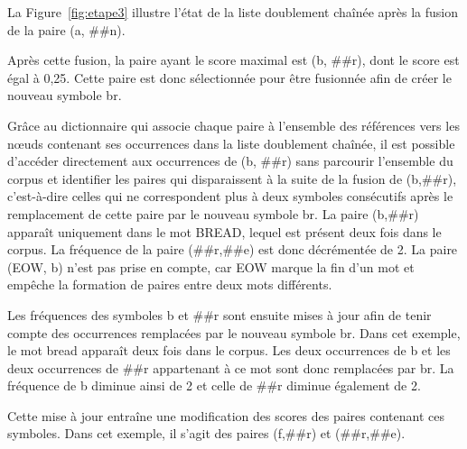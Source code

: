 \documentclass[12pt,a4paper]{report}
\begin{document}
	La Figure~\ref{fig:etape3} illustre l'état de la liste doublement chaînée après la fusion de la paire (a, \#\#n).
	
	Après cette fusion, la paire ayant le score maximal est (b, \#\#r), dont le score est égal à 0,25. Cette paire est donc sélectionnée pour être fusionnée afin de créer le nouveau symbole br.
	
	Grâce au dictionnaire qui associe chaque paire à l'ensemble des références vers les nœuds contenant ses occurrences dans la liste doublement chaînée, il est possible d'accéder directement aux occurrences de (b, \#\#r) sans parcourir l'ensemble du corpus et identifier les paires qui disparaissent à la suite de la fusion de (b,\#\#r), c'est-à-dire celles qui ne correspondent plus à deux symboles consécutifs après le remplacement de cette paire par le nouveau symbole br.
	La paire (b,\#\#r) apparaît uniquement dans le mot BREAD, lequel est présent deux fois dans le corpus. La fréquence de la paire (\#\#r,\#\#e) est donc décrémentée de 2. La paire (EOW, b) n'est pas prise en compte, car EOW marque la fin d'un mot et empêche la formation de paires entre deux mots différents.
	
	Les fréquences des symboles b et \#\#r sont ensuite mises à jour afin de tenir compte des occurrences remplacées par le nouveau symbole br. Dans cet exemple, le mot bread apparaît deux fois dans le corpus. Les deux occurrences de b et les deux occurrences de \#\#r appartenant à ce mot sont donc remplacées par br. La fréquence de b diminue ainsi de 2 et celle de \#\#r diminue également de 2.
	
	Cette mise à jour entraîne une modification des scores des paires contenant ces symboles. Dans cet exemple, il s'agit des paires (f,\#\#r) et (\#\#r,\#\#e).
	
\end{document}
